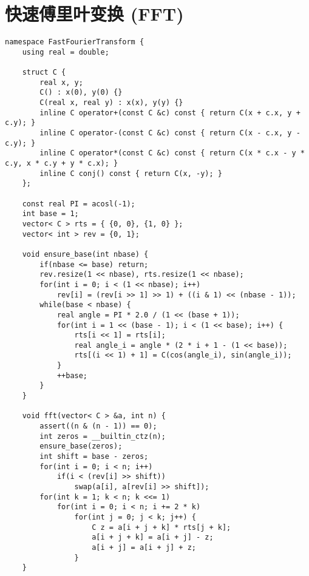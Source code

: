 \section{快速傅里叶变换 (FFT)}

\begin{verbatim}
namespace FastFourierTransform {
    using real = double;

    struct C {
        real x, y;
        C() : x(0), y(0) {}
        C(real x, real y) : x(x), y(y) {}
        inline C operator+(const C &c) const { return C(x + c.x, y + c.y); }
        inline C operator-(const C &c) const { return C(x - c.x, y - c.y); }
        inline C operator*(const C &c) const { return C(x * c.x - y * c.y, x * c.y + y * c.x); }
        inline C conj() const { return C(x, -y); }
    };

    const real PI = acosl(-1);
    int base = 1;
    vector< C > rts = { {0, 0}, {1, 0} };
    vector< int > rev = {0, 1};

    void ensure_base(int nbase) {
        if(nbase <= base) return;
        rev.resize(1 << nbase), rts.resize(1 << nbase);
        for(int i = 0; i < (1 << nbase); i++)
            rev[i] = (rev[i >> 1] >> 1) + ((i & 1) << (nbase - 1));
        while(base < nbase) {
            real angle = PI * 2.0 / (1 << (base + 1));
            for(int i = 1 << (base - 1); i < (1 << base); i++) {
                rts[i << 1] = rts[i];
                real angle_i = angle * (2 * i + 1 - (1 << base));
                rts[(i << 1) + 1] = C(cos(angle_i), sin(angle_i));
            }
            ++base;
        }
    }

    void fft(vector< C > &a, int n) {
        assert((n & (n - 1)) == 0);
        int zeros = __builtin_ctz(n);
        ensure_base(zeros);
        int shift = base - zeros;
        for(int i = 0; i < n; i++)
            if(i < (rev[i] >> shift))
                swap(a[i], a[rev[i] >> shift]);
        for(int k = 1; k < n; k <<= 1)
            for(int i = 0; i < n; i += 2 * k)
                for(int j = 0; j < k; j++) {
                    C z = a[i + j + k] * rts[j + k];
                    a[i + j + k] = a[i + j] - z;
                    a[i + j] = a[i + j] + z;
                }
    }


\end{verbatim}
